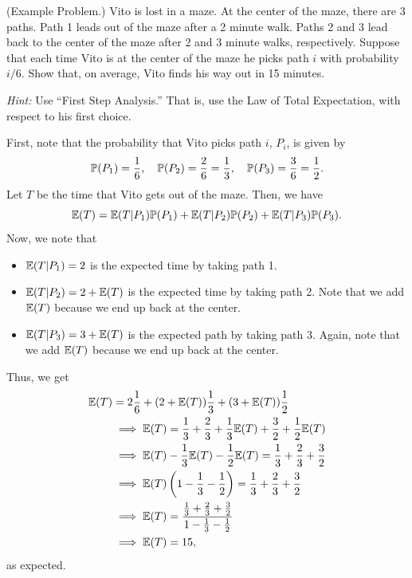\begin{mdframed}[]
    (Example Problem.) Vito is lost in a maze. At the center of the maze, there are 3 paths. Path 1 leads out of the maze after a 2 minute walk. Paths 2 and 3 lead back to the center of the maze after 2 and 3 minute walks, respectively. Suppose that each time Vito is at the center of the maze he picks path $i$ with probability $i/6$. Show that, on average, Vito finds his way out in 15 minutes.

    \bigskip 

    \noindent
    \emph{Hint:} Use ``First Step Analysis.'' That is, use the Law of Total Expectation, with respect to his first choice.

    \begin{mdframed}[]
        First, note that the probability that Vito picks path $i$, $P_i$, is given by 
        \[\mathbb{P}(P_1) = \frac{1}{6}, \quad \mathbb{P}(P_2) = \frac{2}{6} = \frac{1}{3}, \quad \mathbb{P}(P_3) = \frac{3}{6} = \frac{1}{2}.\]
        Let $T$ be the time that Vito gets out of the maze. Then, we have 
        \[\mathbb{E}(T) = \mathbb{E}(T | P_1) \mathbb{P}(P_1) + \mathbb{E}(T | P_2) \mathbb{P}(P_2) + \mathbb{E}(T | P_3) \mathbb{P}(P_3).\]
        Now, we note that 
        \begin{itemize}
            \item $\mathbb{E}(T | P_1) = 2$ is the expected time by taking path 1.
            \item $\mathbb{E}(T | P_2) = 2 + \mathbb{E}(T)$ is the expected time by taking path 2. Note that we add $\mathbb{E}(T)$ because we end up back at the center. 
            \item $\mathbb{E}(T | P_3) = 3 + \mathbb{E}(T)$ is the expected path by taking path 3. Again, note that we add $\mathbb{E}(T)$ because we end up back at the center. 
        \end{itemize}
        Thus, we get 
        \begin{equation*}
            \begin{aligned}
                \mathbb{E}(T) &= 2 \frac{1}{6} + (2 + \mathbb{E}(T)) \frac{1}{3} + (3 + \mathbb{E}(T)) \frac{1}{2} \\ 
                    &\implies \mathbb{E}(T) = \frac{1}{3} + \frac{2}{3} + \frac{1}{3} \mathbb{E}(T) + \frac{3}{2} + \frac{1}{2} \mathbb{E}(T) \\ 
                    &\implies \mathbb{E}(T) - \frac{1}{3} \mathbb{E}(T) - \frac{1}{2} \mathbb{E}(T) = \frac{1}{3} + \frac{2}{3} + \frac{3}{2} \\ 
                    &\implies \mathbb{E}(T) \left(1 - \frac{1}{3} - \frac{1}{2}\right) = \frac{1}{3} + \frac{2}{3} + \frac{3}{2} \\ 
                    &\implies \mathbb{E}(T) = \frac{\frac{1}{3} + \frac{2}{3} + \frac{3}{2}}{1 - \frac{1}{3} - \frac{1}{2}} \\ 
                    &\implies \mathbb{E}(T) = 15,
            \end{aligned}
        \end{equation*}
        as expected.
    \end{mdframed}
\end{mdframed}



